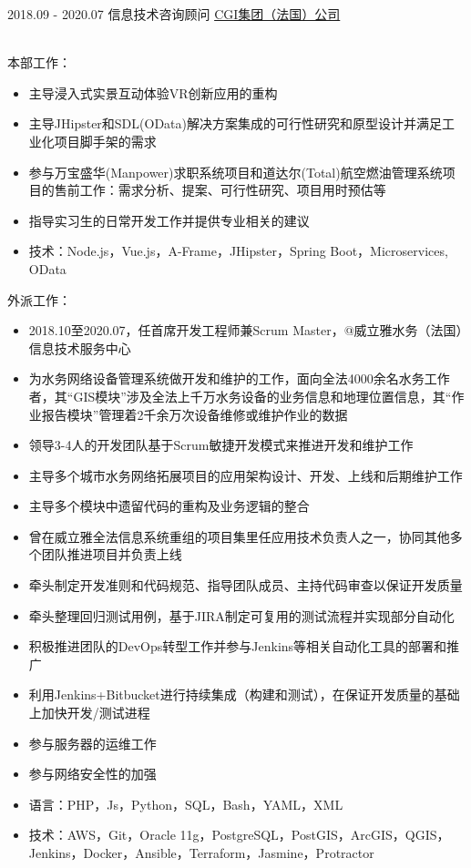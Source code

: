 \documentclass[letterpaper]{twentysecondcv} %
\begin{document}
\begin{twentyfluid}

\twentyitemfluid
    {2018.09 - 2020.07}
    {信息技术咨询顾问}
    {\href{https://www.cgi.fr/fr-fr}{CGI集团（法国）公司}}
    {\\     }
    {
    {
    \\
    本部工作：
    \begin{itemize}
        \item 主导浸入式实景互动体验VR创新应用的重构
        \item 主导JHipster和SDL(OData)解决方案集成的可行性研究和原型设计并满足工业化项目脚手架的需求
        \item 参与万宝盛华(Manpower)求职系统项目和道达尔(Total)航空燃油管理系统项目的售前工作：需求分析、提案、可行性研究、项目用时预估等
        \item 指导实习生的日常开发工作并提供专业相关的建议
        \item 技术：Node.js，Vue.js，A-Frame，JHipster，Spring Boot，Microservices, OData
    \end{itemize}
    外派工作：
    \begin{itemize}
        \item 2018.10至2020.07，任首席开发工程师兼Scrum Master，@威立雅水务（法国）信息技术服务中心
        \item 为水务网络设备管理系统做开发和维护的工作，面向全法4000余名水务工作者，其``GIS模块''涉及全法上千万水务设备的业务信息和地理位置信息，其``作业报告模块''管理着2千余万次设备维修或维护作业的数据
        \item 领导3-4人的开发团队基于Scrum敏捷开发模式来推进开发和维护工作
        \item 主导多个城市水务网络拓展项目的应用架构设计、开发、上线和后期维护工作
        \item 主导多个模块中遗留代码的重构及业务逻辑的整合
        \item 曾在威立雅全法信息系统重组的项目集里任应用技术负责人之一，协同其他多个团队推进项目并负责上线
        \item 牵头制定开发准则和代码规范、指导团队成员、主持代码审查以保证开发质量
        \item 牵头整理回归测试用例，基于JIRA制定可复用的测试流程并实现部分自动化
        \item 积极推进团队的DevOps转型工作并参与Jenkins等相关自动化工具的部署和推广
        \item 利用Jenkins+Bitbucket进行持续集成（构建和测试），在保证开发质量的基础上加快开发/测试进程
        \item 参与服务器的运维工作
        \item 参与网络安全性的加强
        \item 语言：PHP，Js，Python，SQL，Bash，YAML，XML
        \item 技术：AWS，Git，Oracle 11g，PostgreSQL，PostGIS，ArcGIS，QGIS，Jenkins，Docker，Ansible，Terraform，Jasmine，Protractor
    \end{itemize}
    }
    }


\end{twentyfluid}
\end{document}
